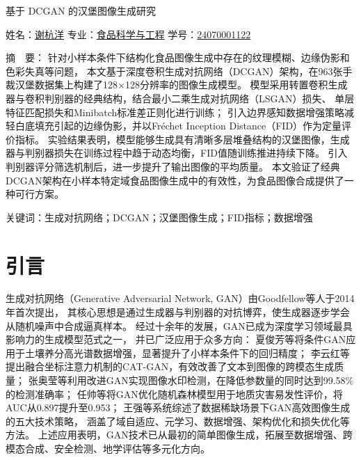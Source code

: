 \documentclass[12pt,a4paper]{ctexart}  %
\begin{document}
\begin{center}
    {\heiti 基于 DCGAN 的汉堡图像生成研究}

    \vspace{1em}
    { 姓名：\underline{谢杭洋} \quad
     专业：\underline{食品科学与工程} \quad
     学号：\underline{24070001122}}
\end{center}

\vspace{1em}
{\heiti 摘\ \ 要：}
针对小样本条件下结构化食品图像生成中存在的纹理模糊、边缘伪影和色彩失真等问题，
本文基于深度卷积生成对抗网络（DCGAN）架构，在963张手裁汉堡数据集上构建了128×128分辨率的图像生成模型。
模型采用转置卷积生成器与卷积判别器的经典结构，结合最小二乘生成对抗网络（LSGAN）损失、
单层特征匹配损失和Minibatch标准差正则化进行训练；
引入边界感知数据增强策略减轻白底填充引起的边缘伪影，并以Fr\'{e}chet Inception Distance（FID）作为定量评价指标。
实验结果表明，模型能够生成具有清晰多层堆叠结构的汉堡图像，生成器与判别器损失在训练过程中趋于动态均衡，FID值随训练推进持续下降。
引入判别器评分筛选机制后，进一步提升了输出图像的平均质量。
本文验证了经典DCGAN架构在小样本特定域食品图像生成中的有效性，为食品图像合成提供了一种可行方案。

\vspace{0.5em}
{\heiti 关键词：}生成对抗网络；DCGAN；汉堡图像生成；FID指标；数据增强

\vspace{1em}
\section{引言}

生成对抗网络（Generative Adversarial Network, GAN）由Goodfellow等人\cite{goodfellow2014gan}于2014年首次提出，
其核心思想是通过生成器与判别器的对抗博弈，使生成器逐步学会从随机噪声中合成逼真样本。
经过十余年的发展，GAN已成为深度学习领域最具影响力的生成模型范式之一，
并已广泛应用于众多方向：
夏俊芳等\cite{xia2026cgan}将条件GAN应用于土壤养分高光谱数据增强，显著提升了小样本条件下的回归精度；
李云红等\cite{li2026catgan}提出融合坐标注意力机制的CAT-GAN，有效改善了文本到图像的跨模态生成质量；
张奥莹等\cite{zhang2026watermark}利用改进GAN实现图像水印检测，在降低参数量的同时达到99.58\%的检测准确率；
任帅等\cite{ren2026ganrf}将GAN优化随机森林模型用于地质灾害易发性评价，将AUC从0.897提升至0.953；
王强等\cite{wang2026survey}系统综述了数据稀缺场景下GAN高效图像生成的五大技术策略，
涵盖了域自适应、元学习、数据增强、架构优化和损失优化等方法。
上述应用表明，GAN技术已从最初的简单图像生成，拓展至数据增强、跨模态合成、安全检测、地学评估等多元化方向。
\end{document}
